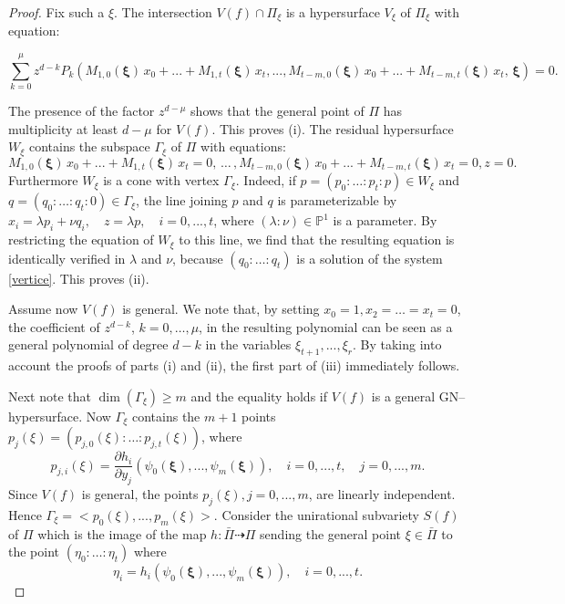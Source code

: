 \documentclass[11pt]{article}   %
\theoremstyle{definition}
\numberwithin{Theorem}{section} \numberwithin{equation}{section}
\newcommand{\p}{{\mathbb P}}
\newcommand{\map}{\dasharrow}
\begin{document}
{\begin{proof}
Fix such a $\xi$. The intersection $V(f)\cap \Pi_\xi$ is a
hypersurface $V_\xi$ of $\Pi_\xi$ with equation:

$$\sum_{k=0}^ \mu z^ {d-k}P_k\left(
M_{1,0}(\mathbf{\xi})\,x_0+...+ M_{1,t}(\mathbf{\xi})\,x_t,...,
M_{t-m,0}(\mathbf{\xi})\,x_0+...+ M_{t-m,t}(\mathbf{\xi})\,x_t,
\,\mathbf{\xi}\right)=0.$$


The presence of the factor $z^ {d-\mu}$ shows that the general point
of $\Pi$ has multiplicity at least $d-\mu$ for $V(f)$. This proves (i). The residual
hypersurface $W_\xi$ contains the subspace $\Gamma_\xi$ of $\Pi$
with equations:
\begin{equation}\label{vertice}
 M_{1,0}(\mathbf{\xi})\,x_0+...+
M_{1,t}(\mathbf{\xi})\,x_t=0,\,\ldots\,,
M_{t-m,0}(\mathbf{\xi})\,x_0+...+ M_{t-m,t}(\mathbf{\xi})\,x_t=0,
z=0.
\end{equation}
Furthermore $W_\xi$ is a cone with vertex $\Gamma_\xi$. Indeed, if
$p=(p_0:\ldots : p_t : p)\in W_\xi$ and $q=(q_0:\ldots :q_t:0)\in
\Gamma_\xi$, the line joining $p$ and $q$ is parameterizable by
$x_i=\lambda p_i+\nu q_i, \quad z= \lambda p,\quad  i=0,...,t$,
where $(\lambda :\nu)\in \p^ 1$ is a parameter. By restricting the
equation of $W_\xi$ to this line, we find that the resulting
equation is identically verified in $\lambda$ and $\nu$, because
$(q_0:\ldots :q_t)$ is a solution of the system \eqref {vertice}.
This proves (ii).

Assume now $V(f)$ is general.
We note that, by setting $x_0=1, x_2=\dots=x_t=0$, the coefficient
of $z^ {d-k}$, $k=0,\dots,\mu$, in the resulting polynomial can be seen
as a general polynomial of degree $d-k$ in the variables
$\xi_{t+1},...,\xi_r$.  By taking into account the proofs of parts (i) and (ii),
the first part of (iii) immediately follows.

Next note that $\dim(\Gamma_\xi)\geq m$ and the equality holds if
$V(f)$ is a general GN--hypersurface. Now $\Gamma_\xi$ contains the
$m+1$ points $p_j(\xi)=(p_{j,0}(\xi):\ldots :p_{j,t}(\xi))$, where
$$p_{j,i}(\xi)= \frac {\partial h_i}{\partial y_j}(\psi_0(\mathbf{\xi}),...,
\psi_m(\mathbf{\xi})), \quad i=0,...,t,  \quad j=0,...,m.$$
 Since $V(f)$ is general, the points $p_j(\xi), j=0,...,m$,
 are linearly independent. Hence $\Gamma_\xi=<p_0(\xi), ...,
p_m(\xi)>$. Consider the unirational subvariety $S(f)$ of $\Pi$
which is the image of the map $h:\bar \Pi\map \Pi$ sending the
general point $\xi\in \bar\Pi$ to the point $(\eta_0:\ldots :\eta_t)$
where
$$\eta_i=h_i(\psi_0(\mathbf{\xi}),...,
\psi_m(\mathbf{\xi})), \quad i=0,...,t.$$


\end{proof}}
\end{document}
